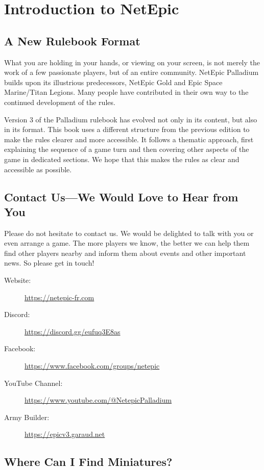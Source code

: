 \onecolumn
\section{Introduction to NetEpic}

\subsection{A New Rulebook Format}

What you are holding in your hands, or viewing on your screen, is not merely the work of a few passionate players, but of an entire community. NetEpic Palladium builds upon its illustrious predecessors, NetEpic Gold and Epic Space Marine/Titan Legions. Many people have contributed in their own way to the continued development of the rules.

Version 3 of the Palladium rulebook has evolved not only in its content, but also in its format. This book uses a different structure from the previous edition to make the rules clearer and more accessible. It follows a thematic approach, first explaining the sequence of a game turn and then covering other aspects of the game in dedicated sections. We hope that this makes the rules as clear and accessible as possible.

\subsection{Contact Us---We Would Love to Hear from You}

Please do not hesitate to contact us. We would be delighted to talk with you or even arrange a game. The more players we know, the better we can help them find other players nearby and inform them about events and other important news. So please get in touch!

\begin{description}
    \item[Website:] \url{https://netepic-fr.com}
    \item[Discord:] \url{https://discord.gg/eufuq3E8as}
    \item[Facebook:] \url{https://www.facebook.com/groups/netepic}
    \item[YouTube Channel:] \url{https://www.youtube.com/@NetepicPalladium}
    \item[Army Builder:] \url{https://epicv3.garaud.net}
\end{description}

\subsection{Where Can I Find Miniatures?}


